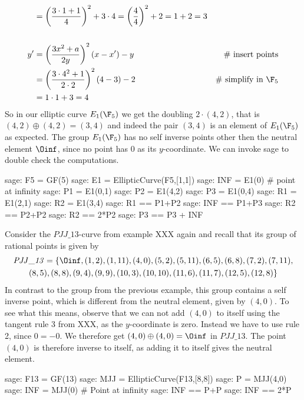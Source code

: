 \begin{example}
\begin{align*}
    & = \left(\frac{3\cdot 1+1}{4}\right)^2 +3\cdot 4
      = \left(\frac{4}{4}\right)^2 +2
      = 1 +2 
      = 3
\\
\\
y'  & = \left(\frac{3x^2+a}{2y}\right)^2\left(x-x'\right) - y  & \text{\# insert points} \\
    & = \left(\frac{3\cdot 4^2+1}{2\cdot 2}\right)^2\left(4-3\right) - 2 & \text{\# simplify in } \F_5\\
    & = 1\cdot 1 + 3
      = 4
\end{align*}
So in our elliptic curve $E_1(\F_5)$ we get the doubling $2\cdot (4,2)$, that is $(4,2)\oplus (4,2) =(3,4)$ and indeed the pair $(3,4)$ is an element of $E_1(\F_5)$ as expected. The group $E_1(\F_5)$ has no self inverse points other then the neutral element $\Oinf$, since no point has $0$ as its $y$-coordinate. We can invoke sage to double check the computations. 
\begin{sagecommandline}
sage: F5 = GF(5)
sage: E1 = EllipticCurve(F5,[1,1])
sage: INF = E1(0) # point at infinity
sage: P1 = E1(0,1)
sage: P2 = E1(4,2)
sage: P3 = E1(0,4)
sage: R1 = E1(2,1)
sage: R2 = E1(3,4)
sage: R1 == P1+P2
sage: INF == P1+P3
sage: R2 == P2+P2
sage: R2 == 2*P2
sage: P3 == P3 + INF
\end{sagecommandline}
\end{example}
\begin{example} Consider the $\mathit{PJJ\_13}$-curve from example XXX again and recall that its group of rational points is given by 
\begin{multline*}
\mathit{PJJ\_13} = \{\Oinf, (1, 2), (1, 11), (4, 0), (5, 2), (5, 11), (6, 5), (6, 8), (7,2), (7, 11), \\ (8, 5), (8, 8), (9, 4), (9, 9), (10, 3), (10,
10), (11, 6), (11, 7), (12, 5), (12, 8)\}
\end{multline*}
In contrast to the group from the previous example, this group contains a self inverse point, which is different from the neutral element, given by $(4,0)$. To see what this means, observe that we can not add $(4,0)$ to itself using the tangent rule 3 from XXX, as the $y$-coordinate is zero. Instead we have to use rule 2, since $0=-0$. We therefore get $(4,0)\oplus (4,0)=\Oinf$ in $\mathit{PJJ\_13}$. The point $(4,0)$ is therefore inverse to itself, as adding it to itself gives the neutral element. 
\begin{sagecommandline}
sage: F13 = GF(13)
sage: MJJ = EllipticCurve(F13,[8,8])
sage: P = MJJ(4,0)
sage: INF = MJJ(0) # Point at infinity
sage: INF == P+P
sage: INF == 2*P
\end{sagecommandline}
\end{example}

